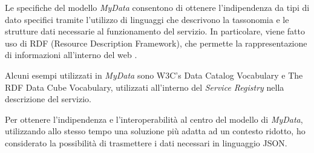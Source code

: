 Le specifiche del modello \textit{MyData} consentono di ottenere l’indipendenza da tipi di dato specifici tramite l’utilizzo di linguaggi che descrivono la tassonomia e le strutture dati necessarie al funzionamento del servizio. In particolare, viene fatto uso di RDF (Resource Description Framework), che permette la rappresentazione di informazioni all’interno del web \cite{w3crdf}.

Alcuni esempi utilizzati in \textit{MyData} sono W3C’s Data Catalog Vocabulary\cite{w3cdatacatalog} e The RDF Data Cube Vocabulary\cite{w3cdatacube}, utilizzati all’interno del \textit{Service Registry} nella descrizione del servizio.

Per ottenere l’indipendenza e l’interoperabilit\`a al centro del modello di \textit{MyData}, utilizzando allo stesso tempo una soluzione pi\`u adatta ad un contesto ridotto, ho considerato la possibilit\`a di trasmettere i dati necessari in linguaggio JSON.


